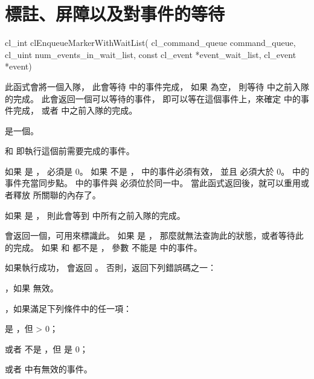 \section{標註、屏障以及對事件的等待}


\startCLFUNC
cl_int clEnqueueMarkerWithWaitList(
			cl_command_queue command_queue,
			cl_uint num_events_in_wait_list,
			const cl_event *event_wait_list,
			cl_event *event)
\stopCLFUNC

此函式會將一個入隊，
此會等待  中的事件完成，
如果  為空，
則等待  中之前入隊的完成。
此會返回一個可以等待的事件，
即可以等在這個事件上，來確定  中的事件完成，
或者  中之前入隊的完成。

 是一個。

 和 
 即執行這個前需要完成的事件。

如果  是 ，
 必須是 0。
如果  不是 ，
 中的事件必須有效，
並且  必須大於 0。
 中的事件充當同步點。
 中的事件與  必須位於同一中。
當此函式返回後，就可以重用或者釋放  所關聯的內存了。

如果  是 ，
則此會等到  中所有之前入隊的完成。

 會返回一個，可用來標識此。
如果  是 ，
那麼就無法查詢此的狀態，或者等待此的完成。
如果  和  都不是 ，
參數  不能是  中的事件。

如果執行成功，  會返回 。
否則，返回下列錯誤碼之一：
\startigBase
\item {}，如果  無效。

\startitem
{}，如果滿足下列條件中的任一項：
\startigBase
\item {} 是 ，但  > 0；
\item 或者  不是 ，但  是 0；
\item 或者  中有無效的事件。
\stopigBase
\stopitem

